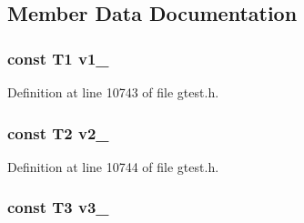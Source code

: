 \subsection{\-Member \-Data \-Documentation}
\hypertarget{classtesting_1_1internal_1_1ValueArray6_aac1d0654cc6c1aceb4a5d0fa7a98042e}{
\subsubsection[{v1\-\_\-}]{\setlength{\rightskip}{0pt plus 5cm}const \-T1 {\bf v1\-\_\-}}}\label{d3/da9/classtesting_1_1internal_1_1ValueArray6_aac1d0654cc6c1aceb4a5d0fa7a98042e}


\-Definition at line 10743 of file gtest.\-h.

\hypertarget{classtesting_1_1internal_1_1ValueArray6_a9f0a8ce6ce2fd27e980c4c51a7a7256a}{
\subsubsection[{v2\-\_\-}]{\setlength{\rightskip}{0pt plus 5cm}const \-T2 {\bf v2\-\_\-}}}\label{d3/da9/classtesting_1_1internal_1_1ValueArray6_a9f0a8ce6ce2fd27e980c4c51a7a7256a}


\-Definition at line 10744 of file gtest.\-h.

\hypertarget{classtesting_1_1internal_1_1ValueArray6_a4f8257321a2eab0456239174d6712d5e}{
\subsubsection[{v3\-\_\-}]{\setlength{\rightskip}{0pt plus 5cm}const \-T3 {\bf v3\-\_\-}}}\label{d3/da9/classtesting_1_1internal_1_1ValueArray6_a4f8257321a2eab0456239174d6712d5e}


